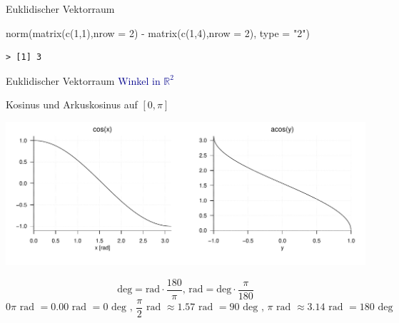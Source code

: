\documentclass[
  8pt,
  ignorenonframetext,
]{beamer}
\newenvironment{Shaded}{\begin{snugshade}}{\end{snugshade}}
\newcommand{\AttributeTok}[1]{\textcolor[rgb]{0.77,0.63,0.00}{#1}}
\newcommand{\DecValTok}[1]{\textcolor[rgb]{0.00,0.00,0.81}{#1}}
\newcommand{\FunctionTok}[1]{\textcolor[rgb]{0.00,0.00,0.00}{#1}}
\newcommand{\NormalTok}[1]{#1}
\newcommand{\SpecialCharTok}[1]{\textcolor[rgb]{0.00,0.00,0.00}{#1}}
\newcommand{\StringTok}[1]{\textcolor[rgb]{0.31,0.60,0.02}{#1}}
\begin{document}
\begin{frame}[fragile]{Euklidischer Vektorraum}
\begin{Shaded}
\begin{Highlighting}[]
\FunctionTok{norm}\NormalTok{(}\FunctionTok{matrix}\NormalTok{(}\FunctionTok{c}\NormalTok{(}\DecValTok{1}\NormalTok{,}\DecValTok{1}\NormalTok{),}\AttributeTok{nrow =} \DecValTok{2}\NormalTok{) }\SpecialCharTok{{-}} \FunctionTok{matrix}\NormalTok{(}\FunctionTok{c}\NormalTok{(}\DecValTok{1}\NormalTok{,}\DecValTok{4}\NormalTok{),}\AttributeTok{nrow =} \DecValTok{2}\NormalTok{), }\AttributeTok{type =} \StringTok{"2"}\NormalTok{)}
\end{Highlighting}
\end{Shaded}

\begin{verbatim}
> [1] 3
\end{verbatim}
\end{frame}

\begin{frame}{Euklidischer Vektorraum}
\protect\hypertarget{euklidischer-vektorraum-8}{}
\textcolor{darkblue}{Winkel in $\mathbb{R}^2$}

Kosinus und Arkuskosinus auf \([0,\pi]\)

\begin{center}\includegraphics[width=1\linewidth]{2_Abbildungen/mvda_2_kosinus} \end{center}

\vspace{-3mm}
\footnotesize

\begin{equation}
\mbox{deg} = \mbox{rad} \cdot \frac{180}{\pi}, \,
\mbox{rad} = \mbox{deg} \cdot \frac{\pi}{180}
\end{equation} \begin{equation}
0\pi \mbox{ rad }                 = 0.00 \mbox{ rad } = 0  \mbox{ deg }, \,
\frac{\pi}{2} \mbox{ rad } \approx  1.57 \mbox{ rad } = 90 \mbox{ deg }, \,
\pi \mbox{ rad } \approx  3.14 \mbox{ rad } = 180 \mbox{ deg }
\end{equation}
\end{frame}
\end{document}

